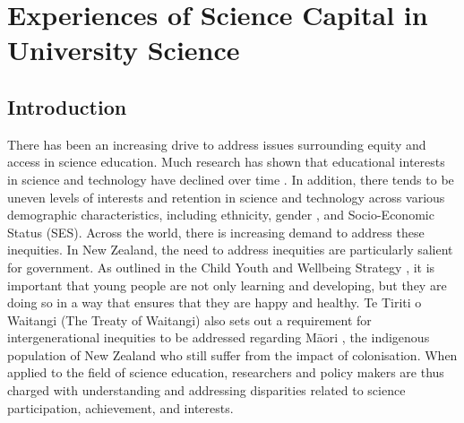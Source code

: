 \chapter{Experiences of Science Capital in University Science}


\section{Introduction}
There has been an increasing drive to address issues surrounding equity and access in science education. Much research has shown that educational interests in science and technology have declined over time \citep{OECD2006}. In addition, there tends to be uneven levels of interests and retention in science and technology across various demographic characteristics, including ethnicity, gender \citep{cheryan2017some,su2015all}, and Socio-Economic Status (SES). Across the world, there is increasing demand to address these inequities. In New Zealand, the need to address inequities are particularly salient for government. As outlined in the Child Youth and Wellbeing Strategy \citep{wellbeing2019}, it is important that young people are not only learning and developing, but they are doing so in a way that ensures that they are happy and healthy. Te Tiriti o Waitangi (The Treaty of Waitangi) also sets out a requirement for intergenerational inequities to be addressed regarding M\={a}ori \citep{treatywaitangi}, the indigenous population of New Zealand who still suffer from the impact of colonisation. When applied to the field of science education, researchers and policy makers are thus charged with understanding and addressing disparities related to science participation, achievement, and interests. 

